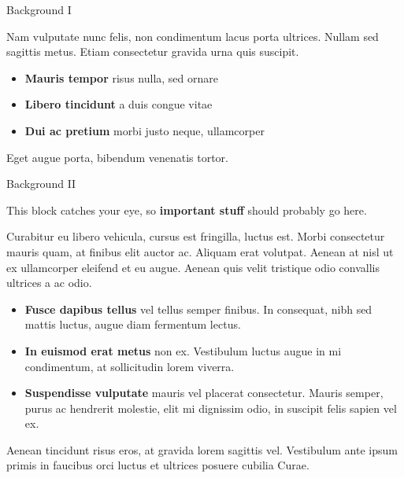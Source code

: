 \begin{block}{Background \textendash{} I}

Nam vulputate nunc felis, non condimentum lacus porta ultrices. Nullam sed
sagittis metus. Etiam consectetur gravida urna quis suscipit.

\begin{itemize}
  \item \textbf{Mauris tempor} risus nulla, sed ornare
  \item \textbf{Libero tincidunt} a duis congue vitae
  \item \textbf{Dui ac pretium} morbi justo neque, ullamcorper
\end{itemize}

Eget augue porta, bibendum venenatis tortor.

\end{block}

\begin{alertblock}{Background \textendash{} II}

This block catches your eye, so \textbf{important stuff} should probably go
here.

Curabitur eu libero vehicula, cursus est fringilla, luctus est. Morbi
consectetur mauris quam, at finibus elit auctor ac. Aliquam erat volutpat.
Aenean at nisl ut ex ullamcorper eleifend et eu augue. Aenean quis velit
tristique odio convallis ultrices a ac odio.

\begin{itemize}
  \item \textbf{Fusce dapibus tellus} vel tellus semper finibus. In
    consequat, nibh sed mattis luctus, augue diam fermentum lectus.
  \item \textbf{In euismod erat metus} non ex. Vestibulum luctus augue in
    mi condimentum, at sollicitudin lorem viverra.
  \item \textbf{Suspendisse vulputate} mauris vel placerat consectetur.
    Mauris semper, purus ac hendrerit molestie, elit mi dignissim odio, in
    suscipit felis sapien vel ex.
\end{itemize}

Aenean tincidunt risus eros, at gravida lorem sagittis vel. Vestibulum ante
ipsum primis in faucibus orci luctus et ultrices posuere cubilia Curae.

\end{alertblock}
